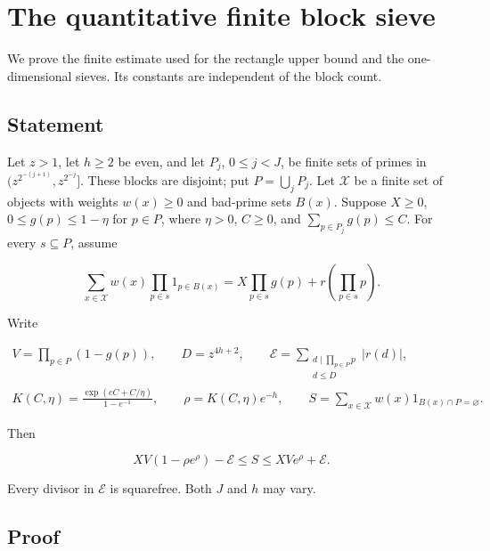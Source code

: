 \hypertarget{block-sieve}{%
\section{The quantitative finite block sieve}\label{block-sieve}}

We prove the finite estimate used for the rectangle upper bound and the
one-dimensional sieves. Its constants are independent of the block
count.


\hypertarget{block-sieve-statement}{%
\subsection{Statement}\label{block-sieve-statement}}

Let \(z>1\), let \(h\ge2\) be even, and let \(P_j\), \(0\le j<J\), be
finite sets of primes in \((z^{2^{-(j+1)}},z^{2^{-j}}]\). These blocks
are disjoint; put \(P=\bigcup_jP_j\). Let \(\mathcal X\) be a finite set
of objects with weights \(w(x)\ge0\) and bad-prime sets \(B(x)\).
Suppose \(X\ge0\), \(0\le g(p)\le1-\eta\) for \(p\in P\), where
\(\eta>0\), \(C\ge0\), and \(\sum_{p\in P_j}g(p)\le C\). For every
\(s\subseteq P\), assume

\[
\sum_{x\in\mathcal X}w(x)\prod_{p\in s}1_{p\in B(x)}
 =X\prod_{p\in s}g(p)+r\!\left(\prod_{p\in s}p\right). \tag{BS1}
\]

Write

\[
\begin{gathered}
V=\prod_{p\in P}(1-g(p)),\qquad D=z^{4h+2},\qquad
\mathcal E=\sum_{\substack{d\mid\prod_{p\in P}p\\d\le D}}|r(d)|,\\
K(C,\eta)=\frac{\exp(eC+C/\eta)}{1-e^{-1}},\qquad
\rho=K(C,\eta)e^{-h},\qquad
S=\sum_{x\in\mathcal X}w(x)1_{B(x)\cap P=\varnothing}.
\end{gathered}
\]

Then

\[
XV(1-\rho e^\rho)-\mathcal E
 \le S\le XV e^\rho+\mathcal E. \tag{BS2}
\]

Every divisor in \(\mathcal E\) is squarefree. Both \(J\) and \(h\) may
vary.


\hypertarget{block-sieve-proof}{%
\subsection{Proof}\label{block-sieve-proof}}

